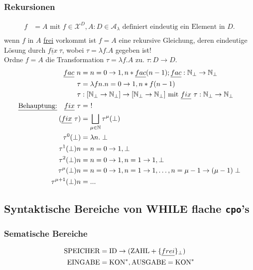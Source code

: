 \subsubsection{Rekursionen}
\begin{align*}
f &= A \text{ mit } f \in \mathcal{X}^D, A:D \in \mathcal{A}_\lambda \text{ definiert eindeutig ein Element in } D.\\
\end{align*}
wenn $f$ in $A$ \underline{frei} vorkommt ist $f=A$ eine rekursive Gleichung, deren eindeutige Lösung durch $ \underline{fix}\ \tau $, wobei $ \tau = \lambda f.A$ gegeben ist!\\
Ordne $f=A$ die Transformation  $\tau = \lambda f.A$ zu. $\tau : D \rightarrow D$.\\
\begin{align*}
\underline{fac}\ n &= n = 0 \rightarrow 1, n * \underline{fac} (n-1); \underline{fac}: \mathbb{N}_\perp \rightarrow \mathbb{N}_\perp\\
\tau &= \lambda f n . n = 0 \rightarrow 1, n * f (n-1) \\
\tau &: [\mathbb{N}_\perp \rightarrow \mathbb{N}_\perp] \rightarrow [\mathbb{N}_\perp \rightarrow \mathbb{N}_\perp] \text{ mit } \underline{fix}\ \tau : \mathbb{N}_\perp \rightarrow \mathbb{N}_\perp\\
\text{\underline{Behauptung:}}\quad \underline{fix}\ \tau &=\ !\\
(\underline{fix}\ \tau) &= \bigsqcup_{\mu \in \mathbb{N}} \tau^\mu (\perp)\\
\tau^0 (\perp) &= \lambda n.\perp \\
\tau^1 (\perp) n &= n = 0 \rightarrow 1, \perp \\
\tau^2 (\perp) n &= n = 0 \rightarrow 1, n = 1 \rightarrow 1, \perp \\
\tau^\mu (\perp) n &= n = 0 \rightarrow 1, n = 1 \rightarrow 1, \dots, n = \mu -1 \rightarrow (\mu -1)\perp \\
\tau^{\mu + 1} (\perp) n &= ... \\
\end{align*}

\subsection{Syntaktische Bereiche von WHILE flache \lstinline!cpo!'s}
\subsubsection{Sematische Bereiche}
\begin{align*}
\text{\lstinline!SPEICHER!} &= \text{\lstinline!ID!} \rightarrow (\text{\lstinline!ZAHL!} + \{\underline{frei}\}_\perp)\\
\text{\lstinline!EINGABE!} &= \text{\lstinline!KON!}^*,\text{\lstinline!AUSGABE!} = \text{\lstinline!KON!}^*\\
\end{align*}
